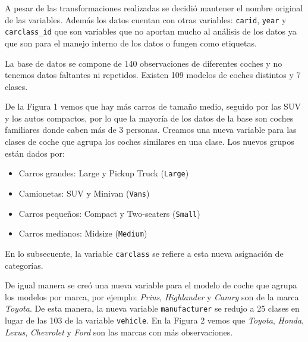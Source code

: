 \documentclass[11pt]{article}
\begin{document}
A pesar de las transformaciones realizadas se decidió mantener el nombre
original de las variables. Además los datos cuentan con otras variables:
\texttt{carid}, \texttt{year} y \texttt{carclass\_id} que son variables
que no aportan mucho al análisis de los datos ya que son para el manejo
interno de los datos o fungen como etiquetas.

    La base de datos se compone de 140 observaciones de diferentes coches y
no tenemos datos faltantes ni repetidos. Existen 109 modelos de coches
distintos y 7 clases.

    \begin{center}
    \end{center}
    
    
    De la Figura 1 vemos que hay más carros de tamaño medio, seguido por las
SUV y los autos compactos, por lo que la mayoría de los datos de la base
son coches familiares donde caben más de 3 personas. Creamos una nueva
variable para las clases de coche que agrupa los coches similares en una
clase. Los nuevos grupos están dados por:

\begin{itemize}
\item
  Carros grandes: Large y Pickup Truck (\texttt{Large})
\item
  Camionetas: SUV y Minivan (\texttt{Vans})
\item
  Carros pequeños: Compact y Two-seaters (\texttt{Small})
\item
  Carros medianos: Midsize (\texttt{Medium})
\end{itemize}

En lo subsecuente, la variable \texttt{carclass} se refiere a esta nueva
asignación de categorías.

    De igual manera se creó una nueva variable para el modelo de coche que
agrupa los modelos por marca, por ejemplo: \emph{Prius},
\emph{Highlander} y \emph{Camry} son de la marca \emph{Toyota}. De esta
manera, la nueva variable \texttt{manufacturer} se redujo a 25 clases en
lugar de las 103 de la variable \texttt{vehicle}. En la Figura 2 vemos
que \emph{Toyota}, \emph{Honda}, \emph{Lexus}, \emph{Chevrolet} y
\emph{Ford} son las marcas con más observaciones.

    \begin{center}
    \end{center}
    
\end{document}
